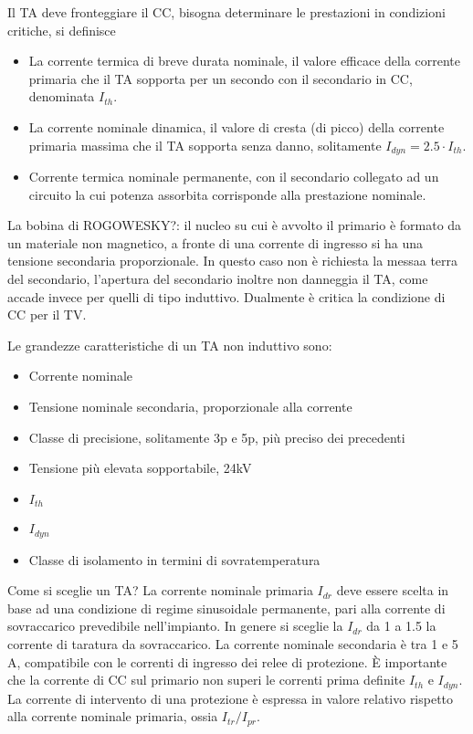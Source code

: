 Il TA deve fronteggiare il CC, bisogna determinare le prestazioni in condizioni critiche, si definisce
\begin{itemize}
    \item La corrente termica di breve durata nominale, il valore efficace della corrente primaria che il TA sopporta per un secondo con il secondario in CC, denominata $I_{th}$.
    \item La corrente nominale dinamica, il valore di cresta (di picco) della corrente primaria massima che il TA sopporta senza danno, solitamente $I_{dyn} = 2.5\cdot I_{th}$.
    \item Corrente termica nominale permanente, con il secondario collegato ad un circuito la cui potenza assorbita corrisponde alla prestazione nominale.
\end{itemize}

\newpage
La bobina di ROGOWESKY?: il nucleo su cui è avvolto il primario è formato da un materiale non magnetico, a fronte di una corrente di ingresso si ha una tensione secondaria proporzionale.
In questo caso non è richiesta la messaa terra del secondario, l'apertura del secondario inoltre non danneggia il TA, come accade invece per quelli di tipo induttivo. Dualmente è critica la condizione di CC per il TV.

Le grandezze caratteristiche di un TA non induttivo sono:
\begin{itemize}
    \item Corrente nominale
    \item Tensione nominale secondaria, proporzionale alla corrente
    \item Classe di precisione, solitamente 3p e 5p, più preciso dei precedenti
    \item Tensione più elevata sopportabile, 24kV
    \item $I_{th}$
    \item $I_{dyn}$
    \item Classe di isolamento in termini di sovratemperatura
\end{itemize}

Come si sceglie un TA? La corrente nominale primaria $I_{dr}$ deve essere scelta in base ad una condizione di regime sinusoidale permanente, pari alla corrente di sovraccarico prevedibile nell'impianto.
In genere si sceglie la $I_{dr}$ da 1 a 1.5 la corrente di taratura da sovraccarico.
La corrente nominale secondaria è tra 1 e 5 A, compatibile con le correnti di ingresso dei relee di protezione.
È importante che la corrente di CC sul primario non superi le correnti prima definite $I_{th}$ e $I_{dyn}$. 
La corrente di intervento di una protezione è espressa in valore relativo rispetto alla corrente nominale primaria, ossia 
$I_{tr}/I_{pr}$.

